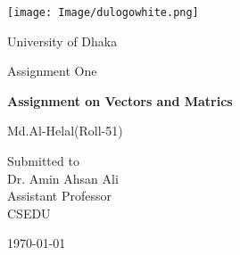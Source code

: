 \documentclass[12pt,a4paper]{report}
\begin{document}
\begin{titlepage}
\centering
\texttt{[image: Image/dulogowhite.png]}\\
{\LARGE University of Dhaka \par}
\vspace{2cm}
{\Large Assignment One\par}
\vspace{2cm}
{\huge\bfseries Assignment on Vectors and Matrics\par}
\vspace{2cm}
{\Large Md.Al-Helal(Roll-51)\par}
\vfill
Submitted to\\
\vspace{0.5cm}
Dr. Amin Ahsan Ali \\ Assistant Professor\\CSEDU
\vfill
{\large \today\par}
\end{titlepage}
\end{document}
